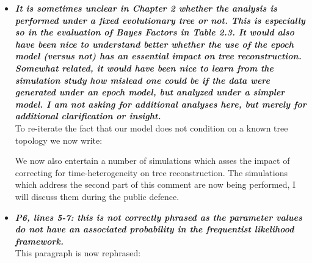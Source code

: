 \documentclass[english]{article}
\begin{document}
\begin{itemize}
\begin{itemize}
\begin{quote}
\myeditsvonec
\end{quote}

\end{itemize}

\item {
{\it
\textbf{
It is sometimes unclear in Chapter 2 whether the analysis is performed under a fixed evolutionary tree or not. 
This is especially so in the evaluation of Bayes Factors in Table 2.3. 
It would also have been nice to understand better whether the use of the epoch model (versus not) has an essential impact on tree reconstruction. 
Somewhat related, it would have been nice to learn from the simulation study how mislead one could be if the data were generated under an epoch model, but analyzed under a simpler model. 
I am not asking for additional analyses here, but merely for additional clarification or insight.
}%
}%
}%
\\
To re-iterate the fact that our model does not condition on a known tree topology we now write:

\begin{quote}
\myeditsvtwo
\end{quote}

We now also entertain a number of simulations which asses the impact of correcting for time-heterogeneity on tree reconstruction. 
The simulations which address the second part of this comment are now being performed, I will discuss them during the public defence.


\item {
{\it
\textbf{
P6, lines 5-7: this is not correctly phrased as the parameter values do not have an associated probability in the frequentist likelihood framework.
}%
}%
}%
\\
This paragraph is now rephrased:

\begin{quote}
\myeditsvthree
\end{quote}



\end{itemize}
\end{document}
